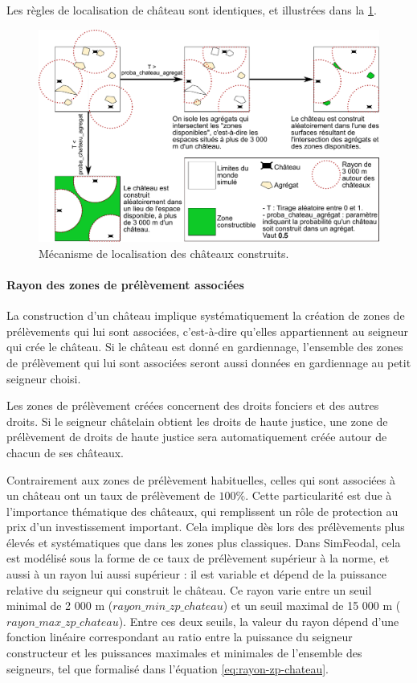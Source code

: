 Les règles de localisation de château sont identiques, et illustrées dans la \cref{fig:construction-chateaux}.

\begin{figure}[H]
	\centering
	\includegraphics[width=\linewidth]{img/construction_chateaux.pdf}
	\caption{Mécanisme de localisation des châteaux construits.}
	\label{fig:construction-chateaux}
\end{figure}

\paragraph{Rayon des zones de prélèvement associées}

La construction d'un château implique systématiquement la création de zones de prélèvements qui lui sont associées, c'est-à-dire qu'elles appartiennent au seigneur qui crée le château.
Si le château est donné en gardiennage, l'ensemble des zones de prélèvement qui lui sont associées seront aussi données en gardiennage au petit seigneur choisi.

Les zones de prélèvement créées concernent des droits fonciers et des autres droits.
Si le seigneur châtelain obtient les droits de haute justice, une zone de prélèvement de droits de haute justice sera automatiquement créée autour de chacun de ses châteaux.

Contrairement aux zones de prélèvement habituelles, celles qui sont associées à un château ont un taux de prélèvement de $100\%$.
Cette particularité est due à l'importance thématique des châteaux, qui remplissent un rôle de protection au prix d'un investissement important.
Cela implique dès lors des prélèvements plus élevés et systématiques que dans les zones plus classiques.
Dans SimFeodal, cela est modélisé sous la forme de ce taux de prélèvement supérieur à la norme, et aussi à un rayon lui aussi supérieur : il est variable et dépend de la puissance relative du seigneur qui construit le château.
Ce rayon varie entre un seuil minimal de 2 000 m ($rayon\_min\_zp\_chateau$) et un seuil maximal de 15 000 m ($rayon\_max\_zp\_chateau$).
Entre ces deux seuils, la valeur du rayon dépend d'une fonction linéaire correspondant au ratio entre la puissance du seigneur constructeur et les puissances maximales et minimales de l'ensemble des seigneurs, tel que formalisé dans l'équation \ref{eq:rayon-zp-chateau}. 


